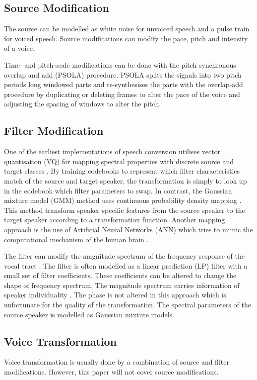 \subsection{Source Modification} %
\label{sub:source_modification}
The source can be modelled as white noise for unvoiced speech and a pulse train for voiced speech. Source modifications can modify the pace, pitch and intensity of a voice. 

Time- and pitch-scale modifications can be done with the pitch synchronous overlap and add (PSOLA) procedure. PSOLA splits the signals into two pitch periods long windowed parts and re-synthesises the parts with the overlap-add procedure by duplicating or deleting frames to alter the pace of the voice and adjusting the spacing of windows to alter the pitch.

\subsection{Filter Modification} %
\label{sub:filter_modification}
One of the earliest implementations of speech conversion utilises vector quantisation (VQ) for mapping spectral properties with discrete source and target classes \cite{abe88}. By training codebooks to represent which filter characteristics match of the source and target speaker, the transformation is simply to look up in the codebook which filter parameters to swap. In contrast, the Gaussian mixture model (GMM) method uses continuous probability density mapping \cite{stylianou98}. This method transform speaker specific features from the source speaker to the target speaker according to a transformation function. Another mapping approach is the use of Artificial Neural Networks (ANN) which tries to mimic the computational mechanism of the human brain \cite{desai09,young75}.

The filter can modify the magnitude spectrum of the frequency response of the vocal tract \cite{nguyen09}. The filter is often modelled as a linear prediction (LP) filter with a small set of filter coefficients. These coefficients can be altered to change the shape of frequency spectrum. The magnitude spectrum carries information of speaker individuality \cite{stylianou09}. The phase is not altered in this approach which is unfortunate for the quality of the transformation. The spectral parameters of the source speaker is modelled as Gaussian mixture models.

\subsection{Voice Transformation} %
\label{sub:voice_transformation}
Voice transformation is usually done by a combination of source and filter modifications. However, this paper will not cover source modifications.

